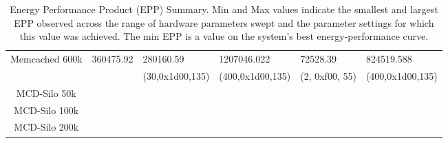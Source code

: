 \begin{table*}[htb]
\begin{tabular}{|c||l||l|l||l|l|}
Memcached 600k                                                                    &         360475.92                     &  280160.59        &   1207046.022      &  72528.39             &   824519.588   \\ 
                                                                                  &                                       & (30,0x1d00,135)    & (400,0x1d00,135)  &   (2, 0xf00, 55)  & (400,0x1d00,135)   \\ \hline \hline

MCD-Silo 50k                                                                       &                                    &                 &                &              &             \\ \hline
MCD-Silo 100k                                                                      &                                    &                 &                &              &             \\ \hline
MCD-Silo 200k                                                                      &                                    &                 &                &              &             \\ \hline  \hline
\end{tabular}
\caption{Energy Performance Product (EPP) Summary. Min and Max values indicate the smallest and largest EPP observed across the range of hardware parameters swept and the parameter settings for which this value was achieved.  The min EPP is a value on the system's best energy-performance curve.}
\label{table:eppsum}
\end{table*}
